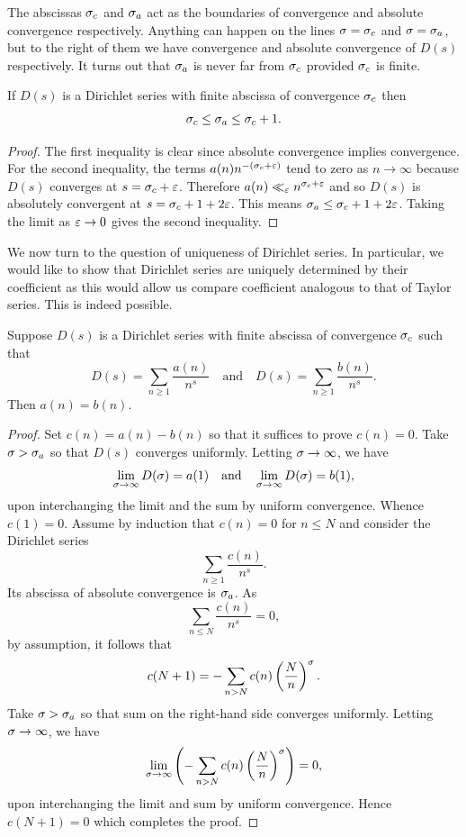     The abscissas \(\sigma_{c}\) and \(\sigma_{a}\) act as the boundaries of convergence and absolute convergence respectively. Anything can happen on the lines \(\sigma = \sigma_{c}\) and \(\sigma = \sigma_{a}\), but to the right of them we have convergence and absolute convergence of \(D(s)\) respectively. It turns out that \(\sigma_{a}\) is never far from \(\sigma_{c}\) provided \(\sigma_{c}\) is finite.

    \begin{theorem}\label{thm:abscissa_of_absolute_convergence_bound}
      If \(D(s)\) is a Dirichlet series with finite abscissa of convergence \(\sigma_{c}\) then
      \[
        \sigma_{c} \le \sigma_{a} \le \sigma_{c}+1.
      \]
    \end{theorem}
    \begin{proof}
      The first inequality is clear since absolute convergence implies convergence. For the second inequality, the terms \(a(n)n^{-(\sigma_{c}+\varepsilon)}\) tend to zero as \(n \to \infty\) because \(D(s)\) converges at \(s = \sigma_{c}+\varepsilon\). Therefore \(a(n) \ll_{\varepsilon} n^{\sigma_{c}+\varepsilon}\) and so \(D(s)\) is absolutely convergent at \(s = \sigma_{c}+1+2\varepsilon\). This means \(\sigma_{a} \le \sigma_{c}+1+2\varepsilon\). Taking the limit as \(\varepsilon \to 0\) gives the second inequality.
    \end{proof}

    We now turn to the question of uniqueness of Dirichlet series. In particular, we would like to show that Dirichlet series are uniquely determined by their coefficient as this would allow us compare coefficient analogous to that of Taylor series. This is indeed possible.

    \begin{proposition}\label{prop:coefficients_of_Dirichlet_series_are_unique}
      Suppose \(D(s)\) is a Dirichlet series with finite abscissa of convergence \(\sigma_{c}\) such that
      \[
        D(s) = \sum_{n \ge 1}\frac{a(n)}{n^{s}} \quad \text{and} \quad D(s) = \sum_{n \ge 1}\frac{b(n)}{n^{s}}.
      \]
      Then \(a(n) = b(n)\).
    \end{proposition}
    \begin{proof}
      Set \(c(n) = a(n)-b(n)\) so that it suffices to prove \(c(n) = 0\). Take \(\sigma > \sigma_{a}\) so that \(D(s)\) converges uniformly. Letting \(\sigma \to \infty\), we have
      \[
        \lim_{\sigma \to \infty}D(\sigma) = a(1) \quad \text{and} \quad \lim_{\sigma \to \infty}D(\sigma) = b(1),
      \]
      upon interchanging the limit and the sum by uniform convergence. Whence \(c(1) = 0\). Assume by induction that \(c(n) = 0\) for \(n \le N\) and consider the Dirichlet series
      \[
        \sum_{n \ge 1}\frac{c(n)}{n^{s}}.
      \]
      Its abscissa of absolute convergence is \(\sigma_{a}\). As
      \[
        \sum_{n \le N}\frac{c(n)}{n^{s}} = 0,
      \]
      by assumption, it follows that
      \[
        c(N+1) = -\sum_{n > N}c(n)\left(\frac{N}{n}\right)^{\sigma}.
      \]
      Take \(\sigma > \sigma_{a}\) so that sum on the right-hand side converges uniformly. Letting \(\sigma \to \infty\), we have
      \[
        \lim_{\sigma \to \infty}\left(-\sum_{n > N}c(n)\left(\frac{N}{n}\right)^{\sigma}\right) = 0,
      \]
      upon interchanging the limit and sum by uniform convergence. Hence \(c(N+1) = 0\) which completes the proof.
    \end{proof}

